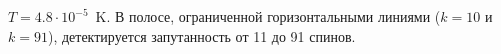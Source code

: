 $T=4.8\cdot10^{-5}$~K.
В полосе, ограниченной горизонтальными линиями ($k=10$ и $k=91$),
детектируется запутанность от 11 до 91 спинов.